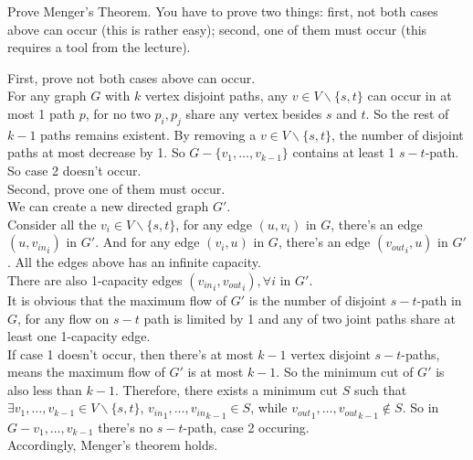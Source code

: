 \documentclass[11pt,a4paper,oneside]{article}
\begin{document}
\begin{problem}{3}
	\statement
   Prove Menger's Theorem. You have to prove two things: first, not both cases above can occur (this is rather easy);
   second, one of them must occur (this requires a tool from the lecture).
   
    \solution
    First, prove not both cases above can occur.\\
    For any graph $G$ with $k$ vertex disjoint paths, any $v \in V \backslash \{ s,t \}$ can occur in at most 1 path $p$, for no two $p_i,p_j$ share any vertex besides $s$ and $t$. So the rest of $k - 1$ paths remains existent. By removing a $v \in V \backslash \{ s,t \}$, the number of disjoint paths at most decrease by 1. So $G - \{v_1,\dots,v_{k - 1}\}$ contains at least 1 $s-t$-path. So case 2 doesn't occur.\\
    Second, prove one of them must occur.\\
    We can create a new directed graph $G'$.\\
    Consider all the $v_i \in V \backslash \{ s,t \}$, for any edge $(u,v_i)$ in $G$, there's an edge $(u,{v_{in}}_i)$ in $G'$. And for any edge $(v_i,u)$ in $G$, there's an edge $({v_{out}}_i,u)$ in $G'$. All the edges above has an infinite capacity.\\
    There are also 1-capacity edges $({v_{in}}_i,{v_{out}}_i) ,\forall i$ in $G'$.\\
    It is obvious that the maximum flow of $G'$ is the number of disjoint $s-t$-path in $G$, for any flow on $s-t$ path is limited by 1 and any of two joint paths share at least one 1-capacity edge.\\
    If case 1 doesn't occur, then there's at most $k - 1$ vertex disjoint $s-t$-paths, means the maximum flow of $G'$ is at most $k - 1$. So the minimum cut of $G'$ is also less than $k - 1$. Therefore, there exists a minimum cut $S$ such that $\exists v_1,\dots,v_{k-1} \in V \backslash \{ s,t \}$, ${v_{in}}_1,\dots,{v_{in}}_{k-1} \in S$, while ${v_{out}}_1,\dots,{v_{out}}_{k-1} \notin S$. So in $G-{v_1,\dots, v_{k - 1}}$ there's no $s-t$-path, case 2 occuring.\\
    Accordingly, Menger's theorem holds.

\end{problem}
\end{document}

